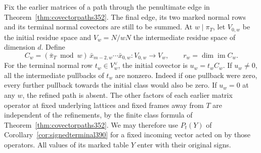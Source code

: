 \documentclass[a4paper,11pt]{article}
\theoremstyle{definition}
\theoremstyle{remark}
\numberwithin{equation}{section}
\begin{document}
Fix the earlier matrices of a path through the penultimate
edge in Theorem~\ref{thm:covectorpaths352}. The final edge,
its two marked normal rows and its terminal normal covectors
are still to be summed. At \(w\mid\pi_T\), let \(V_{0,w}\)
be the initial residue space and \(V_w=N/wN\) the intermediate
residue space of dimension \(d\). Define
\[
 C_w=(\bar\pi_T\bmod w)\,
                 \bar x_{m-2,w}\cdots\bar x_{0,w}
                   :V_{0,w}\longrightarrow V_w,\qquad
 r_w=\dim\operatorname{im} C_w .
\]
For the terminal normal row \(t_w\in V_w^\vee\), the initial
covector is \(u_w=t_w C_w\). If \(u_w\ne0\), all the intermediate
pullbacks of \(t_w\) are nonzero. Indeed if one pullback were
zero, every further pullback towards the initial class would
also be zero. If \(u_w=0\) at any \(w\), the refined path is
absent. The other factors of each earlier matrix operator at
fixed underlying lattices and fixed frames away from \(T\)
are independent of the refinements, by the finite class formula
of Theorem~\ref{thm:covectorpaths352}. We may therefore use
\(P_t(Y)\) of Corollary~\ref{cor:signedterminal390} for a
fixed incoming vector acted on by those operators. All values
of its marked table \(Y\) enter with their original signs.
\end{document}
